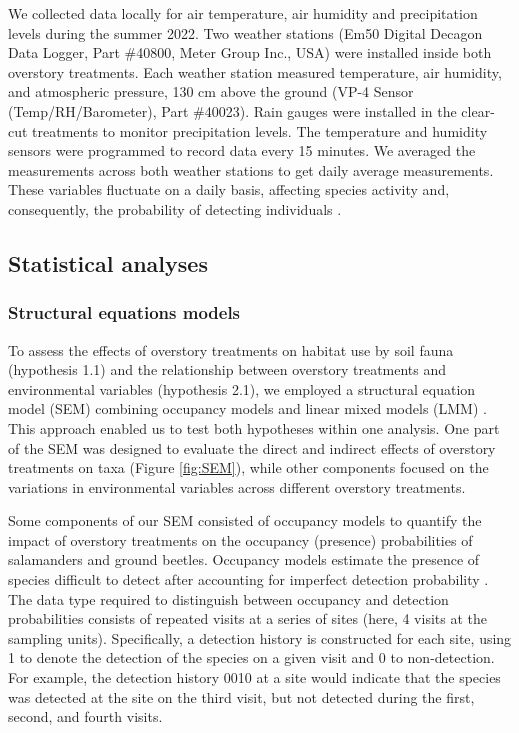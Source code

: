 We collected data locally for air temperature, air humidity and precipitation levels during the summer 2022. 
Two weather stations (Em50 Digital Decagon Data Logger, Part \#40800, Meter Group Inc., USA) were installed inside both overstory treatments. 
Each weather station measured temperature, air humidity, and atmospheric pressure, 130 cm above the ground (VP-4 Sensor (Temp/RH/Barometer), Part \#40023). 
Rain gauges were installed in the clear-cut treatments to monitor precipitation levels. 
The temperature and humidity sensors were programmed to record data every 15 minutes. 
We averaged the measurements across both weather stations to get daily average measurements. 
These variables fluctuate on a daily basis, affecting species activity and, consequently, the probability of detecting individuals \citep{spotilaRoleTemperatureWater1972,butterfieldCarabidLifeCycle1996,loveiEcologyBehaviorGround1996,odonnellPredictingVariationMicrohabitat2014a}.

\subsection*{Statistical analyses}
\label{subsec:analyses}


\subsubsection{Structural equations models} 

To assess the effects of overstory treatments on habitat use by soil fauna (hypothesis 1.1) and the relationship between overstory treatments 
and environmental variables (hypothesis 2.1), we employed a structural equation model (SEM) combining occupancy models and linear mixed models (LMM) \citep{mackenzieOccupancyEstimationModeling2006a,graceSpecificationStructuralEquation2010,josephIntegratingOccupancyModels2016}.
This approach enabled us to test both hypotheses within one analysis. 
One part of the SEM was designed to evaluate the direct and indirect effects of overstory treatments on taxa (Figure \ref*{fig:SEM}), 
while other components focused on the variations in environmental variables across different overstory treatments. 

Some components of our SEM consisted of occupancy models to quantify the impact of overstory treatments on the occupancy (presence) probabilities of salamanders and ground beetles. 
Occupancy models estimate the presence of species difficult to detect after accounting for imperfect detection probability \citep{mackenzieEstimatingSiteOccupancy2002,baileyEstimatingSiteOccupancy2004,mazerolleMakingGreatLeaps2007,spiersEstimatingSpeciesMisclassification2022}. 
The data type required to distinguish between occupancy and detection probabilities consists of repeated visits at a series of sites 
(here, 4 visits at the sampling units). Specifically, a detection history is constructed for each site, 
using 1 to denote the detection of the species on a given visit and 0 to non-detection. 
For example, the detection history 0010 at a site would indicate that the species was detected at the site on the third visit, but not detected during the first, 
second, and fourth visits. 

